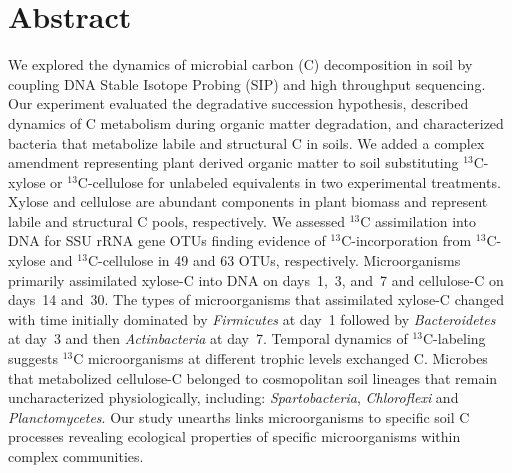 \section{Abstract} We explored the dynamics of microbial carbon (C)
decomposition in soil by coupling DNA Stable Isotope Probing (SIP) and high
throughput sequencing. Our experiment evaluated the degradative succession
hypothesis, described dynamics of C metabolism during organic matter
degradation, and characterized bacteria that metabolize labile and
structural C in soils. We added a complex amendment representing plant
derived organic matter to soil substituting $^{13}$C-xylose
or $^{13}$C-cellulose for unlabeled equivalents in two experimental
treatments. Xylose and cellulose are abundant components in plant biomass
and represent labile and structural C pools, respectively. We assessed
$^{13}$C assimilation into DNA for SSU rRNA gene OTUs finding evidence of
$^{13}$C-incorporation from $^{13}$C-xylose and $^{13}$C-cellulose in 49
and 63 OTUs, respectively. Microorganisms primarily assimilated xylose-C
into DNA on days~1,~3, and~7 and cellulose-C on days~14 and~30. The types
of microorganisms that assimilated xylose-C changed with time initially
dominated by \textit{Firmicutes} at day~1 followed by
\textit{Bacteroidetes} at day~3 and then \textit{Actinbacteria} at day~7.
Temporal dynamics of $^{13}$C-labeling suggests $^{13}$C microorganisms at
different trophic levels exchanged C. Microbes that metabolized
cellulose-C belonged to cosmopolitan soil lineages that remain
uncharacterized physiologically, including: \textit{Spartobacteria},
\textit{Chloroflexi} and \textit{Planctomycetes}. Our study unearths links
microorganisms to specific soil C processes revealing ecological
properties of specific microorganisms within complex communities.
